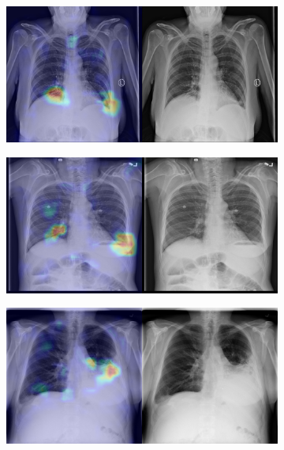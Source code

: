 \begin{figure}[b]
    \begin{subfigure}{0.4\textwidth}
        \centering
        \includegraphics[width=1.0\textwidth]{Chapters/5. Conclusiones/img/Atelectasis/1_1_00000150_003.png}
    \end{subfigure}
    \begin{subfigure}{0.4\textwidth}
        \centering
        \includegraphics[width=1.0\textwidth]{Chapters/5. Conclusiones/img/Atelectasis/1_1_00000150_004.png}
    \end{subfigure}
    \begin{subfigure}{0.4\textwidth}
        \centering
        \includegraphics[width=1.0\textwidth]{Chapters/5. Conclusiones/img/Atelectasis/1_1_00000467_000.png}

\end{subfigure}
\end{figure}
